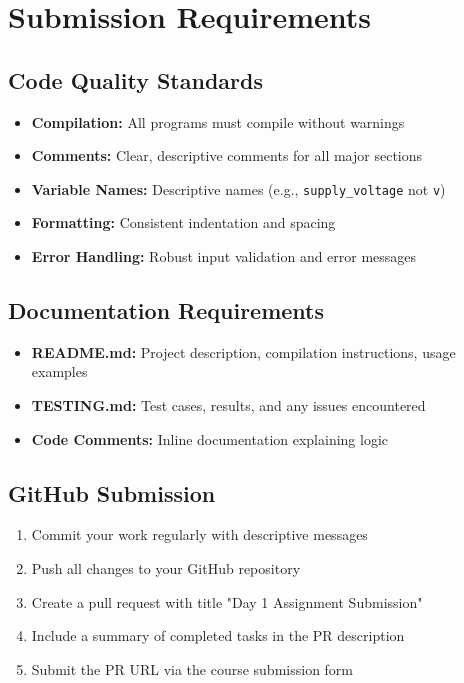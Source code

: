 \documentclass[11pt,a4paper]{article}
\begin{document}
\section{Submission Requirements}

\subsection{Code Quality Standards}
\begin{itemize}
    \item \textbf{Compilation:} All programs must compile without warnings
    \item \textbf{Comments:} Clear, descriptive comments for all major sections
    \item \textbf{Variable Names:} Descriptive names (e.g., \texttt{supply\_voltage} not \texttt{v})
    \item \textbf{Formatting:} Consistent indentation and spacing
    \item \textbf{Error Handling:} Robust input validation and error messages
\end{itemize}

\subsection{Documentation Requirements}
\begin{itemize}
    \item \textbf{README.md:} Project description, compilation instructions, usage examples
    \item \textbf{TESTING.md:} Test cases, results, and any issues encountered
    \item \textbf{Code Comments:} Inline documentation explaining logic
\end{itemize}

\subsection{GitHub Submission}
\begin{enumerate}
    \item Commit your work regularly with descriptive messages
    \item Push all changes to your GitHub repository
    \item Create a pull request with title "Day 1 Assignment Submission"
    \item Include a summary of completed tasks in the PR description
    \item Submit the PR URL via the course submission form
\end{enumerate}
\end{document}
